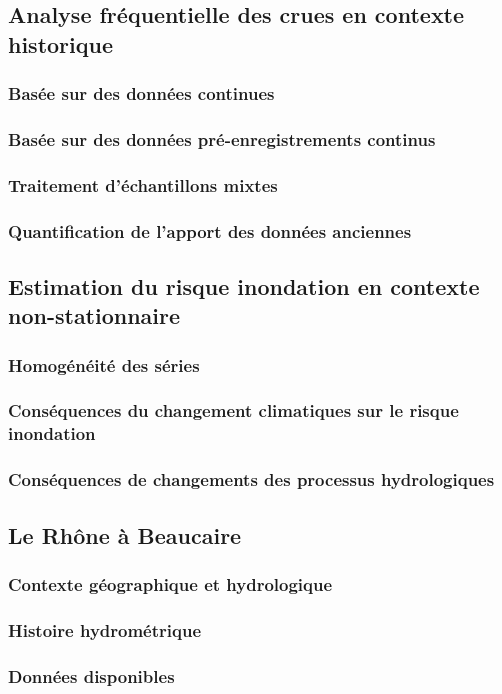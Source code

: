 \documentclass[11pt]{article}
\begin{document}
	\subsection{Analyse fréquentielle des crues en contexte historique}
		\subsubsection{Basée sur des données continues}
		\subsubsection{Basée sur des données pré-enregistrements continus}
		\subsubsection{Traitement d'échantillons mixtes}
		\subsubsection{Quantification de l'apport des données anciennes}
		
	\subsection{Estimation du risque inondation en contexte non-stationnaire}
		\subsubsection{Homogénéité des séries}
		\subsubsection{Conséquences du changement climatiques sur le risque inondation}
		\subsubsection{Conséquences de changements des processus hydrologiques}
		
	\subsection{Le Rhône à Beaucaire}
		\subsubsection{Contexte géographique et hydrologique}
		\subsubsection{Histoire hydrométrique}
		\subsubsection{Données disponibles}




\printbibliography
\end{document}
